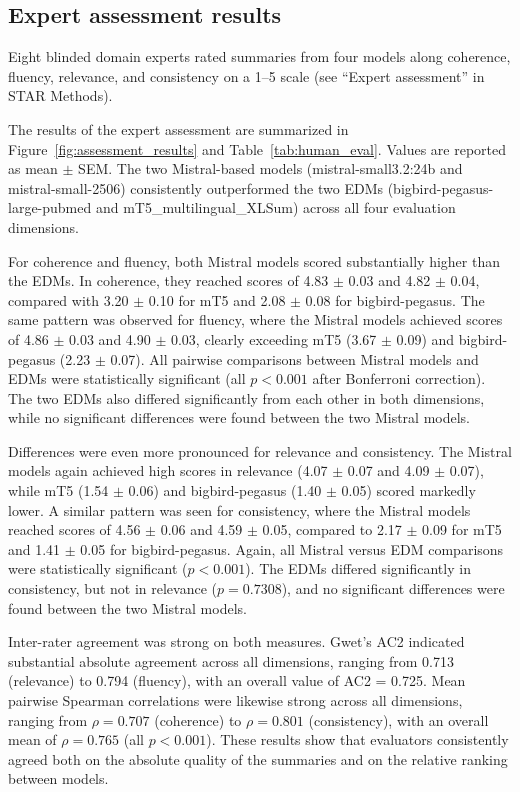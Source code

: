 \subsection{Expert assessment results}

Eight blinded domain experts rated summaries from four models along coherence, fluency, relevance, and consistency on a 1–5 scale (see ``Expert assessment'' in STAR Methods).

The results of the expert assessment are summarized in Figure~\ref{fig:assessment_results} and Table~\ref{tab:human_eval}. Values are reported as mean $\pm$ \ac{SEM}. The two Mistral-based models (mistral-small3.2:24b and mistral-small-2506) consistently outperformed the two \acp{EDM} (bigbird-pegasus-large-pubmed and mT5\_multilingual\_XLSum) across all four evaluation dimensions.

For coherence and fluency, both Mistral models scored substantially higher than the \acp{EDM}. In coherence, they reached scores of 4.83 $\pm$ 0.03 and 4.82 $\pm$ 0.04, compared with 3.20 $\pm$ 0.10 for mT5 and 2.08 $\pm$ 0.08 for bigbird-pegasus. The same pattern was observed for fluency, where the Mistral models achieved scores of 4.86 $\pm$ 0.03 and 4.90 $\pm$ 0.03, clearly exceeding mT5 (3.67 $\pm$ 0.09) and bigbird-pegasus (2.23 $\pm$ 0.07). All pairwise comparisons between Mistral models and \acp{EDM} were statistically significant (all $p < 0.001$ after Bonferroni correction). The two \acp{EDM} also differed significantly from each other in both dimensions, while no significant differences were found between the two Mistral models.

Differences were even more pronounced for relevance and consistency. The Mistral models again achieved high scores in relevance (4.07 $\pm$ 0.07 and 4.09 $\pm$ 0.07), while mT5 (1.54 $\pm$ 0.06) and bigbird-pegasus (1.40 $\pm$ 0.05) scored markedly lower. A similar pattern was seen for consistency, where the Mistral models reached scores of 4.56 $\pm$ 0.06 and 4.59 $\pm$ 0.05, compared to 2.17 $\pm$ 0.09 for mT5 and 1.41 $\pm$ 0.05 for bigbird-pegasus. Again, all Mistral versus \ac{EDM} comparisons were statistically significant ($p < 0.001$). The \acp{EDM} differed significantly in consistency, but not in relevance ($p = 0.7308$), and no significant differences were found between the two Mistral models.

Inter-rater agreement was strong on both measures. Gwet's AC2 indicated substantial absolute agreement across all dimensions, ranging from 0.713 (relevance) to 0.794 (fluency), with an overall value of AC2 = 0.725. Mean pairwise Spearman correlations were likewise strong across all dimensions, ranging from $\rho = 0.707$ (coherence) to $\rho = 0.801$ (consistency), with an overall mean of $\rho = 0.765$ (all $p < 0.001$). These results show that evaluators consistently agreed both on the absolute quality of the summaries and on the relative ranking between models.


